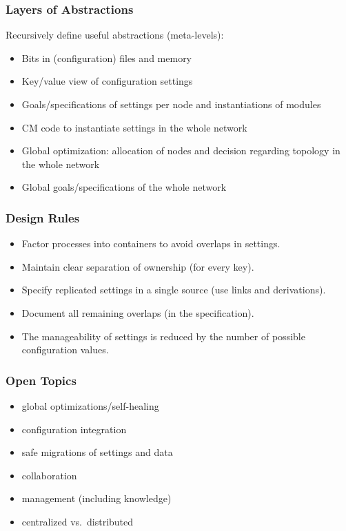 \begin{frame}
	\frametitle{Layers of Abstractions}

	Recursively define useful abstractions (meta-levels):

	\begin{itemize}[<+-| alert@+>]
	\item Bits in (configuration) files and memory
	\item Key/value view of configuration settings
	\item Goals/specifications of settings per node and instantiations of modules
	\vspace{1em}
	\item CM code to instantiate settings in the whole network
	\item Global optimization: allocation of nodes and decision regarding topology in the whole network
	\item Global goals/specifications of the whole network
	\end{itemize}
\end{frame}

\begin{frame}
	\frametitle{Design Rules~\cite{burgess2006modeling}}

	\begin{itemize}[<+-| alert@+>]
	\item Factor processes into containers to avoid overlaps in settings.
	\item Maintain clear separation of ownership (for every key).
	\item Specify replicated settings in a single source (use links and derivations).
	\item Document all remaining overlaps (in the specification).
	\item The manageability of settings is reduced by the number of possible configuration values.
	\end{itemize}
\end{frame}


\begin{frame}
	\frametitle{Open Topics}

	\begin{itemize}[<+-| alert@+>]
	\item global optimizations/self-healing
	\item configuration integration
	\item safe migrations of settings and data
	\item collaboration
	\item management (including knowledge)
	\item centralized vs.\ distributed
	\end{itemize}
\end{frame}


